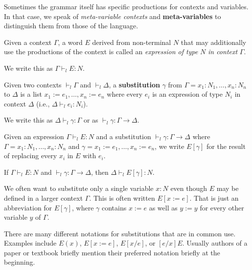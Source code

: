 \begin{remark}
Sometimes the grammar itself has specific productions for contexts and variables.
In that case, we speak of \emph{meta-variable contexts} and \textbf{meta-variables} to distinguish them from those of the language.
\end{remark}

\begin{definition}
Given a context $\Gamma$, a word $E$ derived from non-terminal $N$ that may additionally use the productions of the context is called an \emph{expression of type} $N$ \emph{in context} $\Gamma$.

We write this as $\Gamma\vdash_l E:N$.
\end{definition}

\begin{definition}[Substitution]
Given two contexts $\vdash_l \Gamma$ and $\vdash_l\Delta$, a \textbf{substitution} $\gamma$ from $\Gamma=x_1:N_1,\ldots,x_n:N_n$ to $\Delta$ is a list $x_1:=e_1,\ldots,x_n:=e_n$ where every $e_i$ is an expression of type $N_i$ in context $\Delta$ (i.e., $\Delta\vdash_l e_i:N_i$).

We write this as $\Delta\vdash_l \gamma:\Gamma$ or as $\vdash_l \gamma:\Gamma\to \Delta$.
\end{definition}

\begin{definition}\label{def:subapp}
Given an expression $\Gamma\vdash_l E:N$ and a substitution $\vdash_l\gamma:\Gamma\to\Delta$ where $\Gamma=x_1:N_1,\ldots,x_n:N_n$ and $\gamma=x_1:=e_1,\ldots,x_n:=e_n$, we write $E[\gamma]$ for the result of replacing every $x_i$ in $E$ with $e_i$.
\end{definition}

\begin{theorem}
If $\Gamma\vdash_l E:N$ and $\vdash_l\gamma:\Gamma\to\Delta$, then $\Delta\vdash_l E[\gamma]:N$.
\end{theorem}

We often want to substitute only a single variable $x:N$ even though $E$ may be defined in a larger context $\Gamma$.
This is often written $E[x:=e]$.
That is just an abbreviation for $E[\gamma]$, where $\gamma$ contains $x:=e$ as well as $y:=y$ for every other variable $y$ of $\Gamma$.

\begin{notation}
There are many different notations for substitutions that are in common use.
Examples include $E(x)$, $E[x:=e]$, $E[x/e]$, or $[e/x]E$.
Usually authors of a paper or textbook briefly mention their preferred notation briefly at the beginning.
\end{notation}

